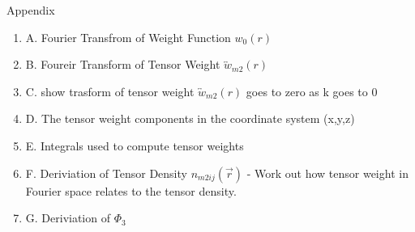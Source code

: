 \documentclass[letterpaper,twocolumn,amsmath,amssymb,prb]{revtex4-1}
\begin{document}
\begin{widetext}
\[{}\]


Appendix
\begin{enumerate}
\item A. Fourier Transfrom of Weight Function $w_0(r)$  
\item B. Foureir Transform of Tensor Weight $\overleftrightarrow{w}_{m2}(r)$
\item C. show trasform of tensor weight $\overleftrightarrow{w}_{m2}(r)$ goes to zero as k goes to 0
\item D. The tensor weight components in the coordinate system (x,y,z) 
\item E. Integrals used to compute tensor weights
\item F. Deriviation of Tensor Density $n_{m2ij}(\vec{r})$ - Work out how tensor weight in Fourier space relates to the tensor density.
\item G. Deriviation of $\Phi_3$ 
\end{enumerate}



\[{}\]

\end{widetext}
\end{document}
